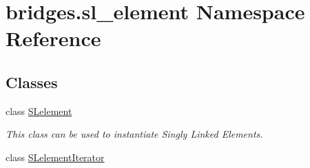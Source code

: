 \hypertarget{namespacebridges_1_1sl__element}{}\section{bridges.\+sl\+\_\+element Namespace Reference}
\label{namespacebridges_1_1sl__element}
\subsection*{Classes}
\begin{DoxyCompactItemize}
\item 
class \hyperlink{classbridges_1_1sl__element_1_1_s_lelement}{S\+Lelement}
\begin{DoxyCompactList}\small\item\em This class can be used to instantiate Singly Linked Elements. \end{DoxyCompactList}\item 
class \hyperlink{classbridges_1_1sl__element_1_1_s_lelement_iterator}{S\+Lelement\+Iterator}
\end{DoxyCompactItemize}
